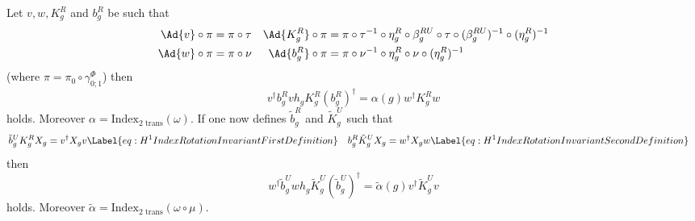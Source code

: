 \begin{lemma}
	Let $v,w,K_g^R$ and $b_g^R$ be such that
	\begin{align}
		\Ad{v}\circ\pi&=\pi\circ\tau&\Ad{K_g^R}\circ\pi&=\pi\circ\tau^{-1}\circ\eta_g^R\circ\beta_g^{RU}\circ\tau\circ(\beta_g^{RU})^{-1}\circ(\eta_g^R)^{-1}\\
		\Ad{w}\circ\pi&=\pi\circ\nu&\Ad{b_g^R}\circ\pi&=\pi\circ\nu^{-1}\circ\eta_g^R\circ\nu\circ(\eta_g^R)^{-1}
	\end{align}
	(where $\pi=\pi_0\circ\gamma^\Phi_{0;1}$) then
	\begin{equation}\label{eq:H^1IndexRotationInvariantHorizontalIndex}
		v^\dagger b_g^R vh_g K_g^R (b_g^R)^\dagger=\alpha(g)w^\dagger K_g^R w
	\end{equation}
	holds. Moreover $\alpha=\textrm{Index}_{\text{2 trans}}(\omega)$. If one now defines $\tilde{b}_g^R$ and $\tilde{K}_g^U$ such that
	\begin{align*}
		\tilde{b}_g^UK_g^R X_g&=v^\dagger X_g v\Label{eq:H^1IndexRotationInvariantFirstDefinition}&b_g^R\tilde{K}_g^UX_g&=w^\dagger X_g w\Label{eq:H^1IndexRotationInvariantSecondDefinition}
	\end{align*}
	then
	\begin{equation}\label{eq:H^1IndexRotationInvariantVerticalIndex}
		w^\dagger \tilde b_g^U wh_g \tilde K_g^U (\tilde b_g^U)^\dagger=\tilde\alpha(g)v^\dagger \tilde K_g^U v
	\end{equation}
	holds. Moreover $\tilde\alpha=\textrm{Index}_{\text{2 trans}}(\omega\circ\mu)$.
\end{lemma}

